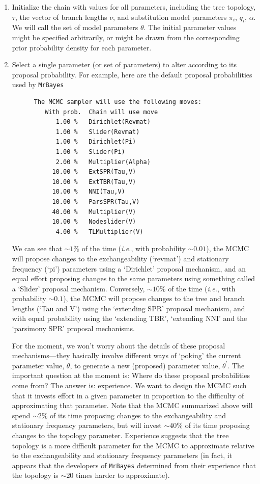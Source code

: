 \documentclass[11pt]{article}
\begin{document}
\begin{enumerate}
\item{Initialize the chain with values for all parameters, including the tree topology, $\tau$, the vector of branch lengths $\nu$, and substitution model parameters $\pi_i$, $q_i$, $\alpha$. 
We will call the set of model parameters $\theta$. The initial parameter values might be specified arbitrarily, or might be drawn from the corresponding prior probability density for each parameter.}

\item{Select a single parameter (or set of parameters) to alter according to its proposal probability. 
For example, here are the default proposal probabilities used by \verb!MrBayes!\:
{\tt \scriptsize \begin{framed}
\begin{lstlisting}
      The MCMC sampler will use the following moves:
         With prob.  Chain will use move
            1.00 %   Dirichlet(Revmat)
            1.00 %   Slider(Revmat)
            1.00 %   Dirichlet(Pi)
            1.00 %   Slider(Pi)
            2.00 %   Multiplier(Alpha)
           10.00 %   ExtSPR(Tau,V)
           10.00 %   ExtTBR(Tau,V)
           10.00 %   NNI(Tau,V)
           10.00 %   ParsSPR(Tau,V)
           40.00 %   Multiplier(V)
           10.00 %   Nodeslider(V)
            4.00 %   TLMultiplier(V)
\end{lstlisting}
\end{framed}}

We can see that $\sim 1\%$ of the time ({\it i.e.}, with probability $\sim 0.01$), the MCMC will propose changes to the exchangeability (`revmat’) and stationary frequency (`pi’) parameters using a `Dirichlet' proposal mechanism, and an equal effort proposing changes to the same parameters using something called a `Slider’ proposal mechanism.
Conversely, $\sim 10\%$ of the time ({\it i.e.}, with probability $\sim 0.1$), the MCMC will propose changes to the tree and branch lengths (`Tau and V’) using the `extending SPR’ proposal mechanism, and with equal probability using the `extending TBR’, `extending NNI’ and the `parsimony SPR’ proposal mechanisms.

For the moment, we won’t worry about the details of these proposal mechanisms---they basically involve different ways of `poking’ the current parameter value, $\theta$, to generate a new (proposed) parameter value, $\theta ^{\prime}$. 
The important question at the moment is: Where do these proposal probabilities come from? 
The answer is: experience. 
We want to design the MCMC such that it invests effort in a given parameter in proportion to the difficulty of approximating that parameter. 
Note that the MCMC summarized above will spend $\sim 2\%$ of its time proposing changes to the exchangeability and stationary frequency parameters, but will invest $\sim 40\%$ of its time proposing changes to the topology parameter. 
Experience suggests that the tree topology is a more difficult parameter for the MCMC to approximate relative to the exchangeability and stationary frequency parameters (in fact, it appears that the developers of \verb!MrBayes! determined from their experience that the topology is $\sim 20$ times harder to approximate).}


\end{enumerate}
\end{document}
